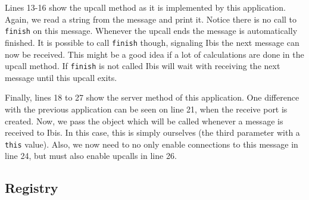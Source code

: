 Lines 13-16 show the upcall method as it is implemented by this
application. Again, we read a string from the message and print it.
Notice there is no call to \texttt{finish} on this message. Whenever the
upcall ends the message is automatically finished. It is possible to
call \texttt{finish} though, signaling Ibis the next message can now be
received. This might be a good idea if a lot of calculations are done in
the upcall method. If \texttt{finish} is not called Ibis will wait with
receiving the next message until this upcall exits.

Finally, lines 18 to 27 show the server method of this application. One
difference with the previous application can be seen on line 21, when
the receive port is created. Now, we pass the object which will be
called whenever a message is received  to Ibis. In this case, this is
simply ourselves (the third parameter with a \texttt{this} value). Also,
we now need to no only enable connections to this message in line 24,
but must also enable upcalls in line 26.

\subsection{Registry}

